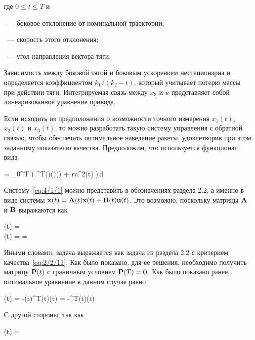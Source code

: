 где $0 \leqslant t \leqslant T$ и

\bdescr
    \item[$x_1$]~--- боковое отклонение от номинальной траектории;
    \item[$x_2$]~--- скорость этого отклонения;
    \item[$x_3$]~--- угол направления вектора тяги.
\edescr

Зависимость между боковой тягой и боковым ускорением нестационарна и определяется коэффициентом $k_1 / (k_2 - t)$, который учитывает потерю массы при действии тяги. Интегрируемая связь между $x_3$ и $u$ представляет собой линеаризованное уравнение привода.

Если исходить из предположения о возможности точного измерения $x_1(t)$, $x_2(t)$ и $x_3(t)$, то можно разработать такую систему управления с обратной связью, чтобы обеспечить оптимальное наведение ракеты, удовлетворив при этом заданному показателю качества. Предположим, что используется функционал вида

    \funcF =  \int\limits_0^T \bigl( ^T(\tau)(\tau)(\tau) + ru^2(t) \bigr)\,d\tau {}
\eeq

Систему~\ref{eq:4/1/1} можно представить в обозначениях раздела 2.2, а именно в виде системы $\mathbf{x}(t) = \mathbf{A}(t)\mathbf{x}(t) + \mathbf{B}(t)\mathbf{u}(t)$. Это возможно, поскольку матрицы $\mathbf{A}$ и $\mathbf{B}$ выражаются как

\beqarr
        (t) =  \text{;} \\
        (t) =  =  
\eeqarr

Иными словами, задача выражается как задача из раздела 2.2 с критерием качества~\vref{eq:2/2/11}. Как было показано, для ее решения, необходимо получить матрицу $\mathbf{P}(t)$ с граничным условием $\mathbf{P}(T) = \mathbf{0}$. Как было показано ранее, оптимальное уравнение в данном случае равно

    \optU(t) = -(t)^T(t)(t) = -^T(t)(t) 
\eeq

С другой стороны, так как

    (t) =  \text{,}
\eeq

